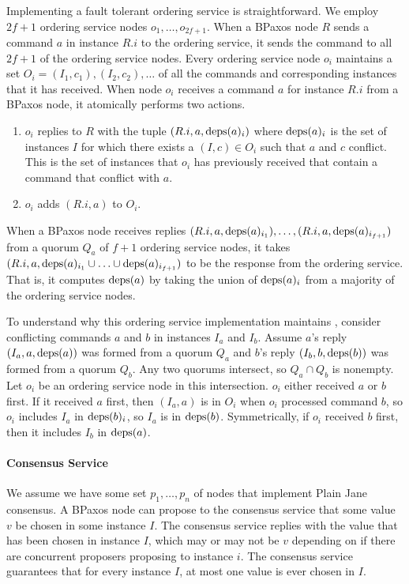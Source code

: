 Implementing a fault tolerant ordering service is straightforward. We employ
$2f + 1$ ordering service nodes $o_{1}, \ldots, o_{2f + 1}$. When a BPaxos node
$R$ sends a command $a$ in instance $R.i$ to the ordering service, it sends the
command to all $2f + 1$ of the ordering service nodes. Every ordering service
node $o_i$ maintains a set $O_i = {(I_1, c_1), (I_2, c_2), \ldots}$ of all the
commands and corresponding instances that it has received. When node $o_i$
receives a command $a$ for instance $R.i$ from a BPaxos node, it atomically
performs two actions.
\begin{enumerate}
  \item
    $o_i$ replies to $R$ with the tuple $(R.i, a, \text{deps}(a)_i)$ where
    $\text{deps}(a)_i$ is the set of instances $I$ for which there exists a $(I, c)
    \in O_i$ such that $a$ and $c$ conflict. This is the set of instances that
    $o_i$ has previously received that contain a command that conflict with
    $a$.

  \item
    $o_i$ adds $(R.i, a)$ to $O_i$.
\end{enumerate}

When a BPaxos node receives replies $(R.i, a, \text{deps}(a)_{i_1}), \ldots, (R.i, a,
\text{deps}(a)_{i_{f+1}})$ from a quorum $Q_a$ of $f + 1$ ordering service nodes, it
takes $(R.i, a, \text{deps}(a)_{i_1} \cup \ldots \cup \text{deps}(a)_{i_{f+1}})$ to be the
response from the ordering service. That is, it computes $\text{deps}(a)$ by taking
the union of $\text{deps}(a)_i$ from a majority of the ordering service nodes.

To understand why this ordering service implementation maintains
, consider conflicting commands $a$ and $b$ in
instances $I_a$ and $I_b$. Assume $a$'s reply $(I_a, a, \text{deps}(a))$ was formed
from a quorum $Q_a$ and $b$'s reply $(I_b, b, \text{deps}(b))$ was formed from a
quorum $Q_b$. Any two quorums intersect, so $Q_a \cap Q_b$ is nonempty. Let
$o_i$ be an ordering service node in this intersection. $o_i$ either received
$a$ or $b$ first. If it received $a$ first, then $(I_a, a)$ is in $O_i$ when
$o_i$ processed command $b$, so $o_i$ includes $I_a$ in $\text{deps}(b)_i$, so $I_a$
is in $\text{deps}(b)$.  Symmetrically, if $o_i$ received $b$ first, then it includes
$I_b$ in $\text{deps}(a)$.

\paragraph{Consensus Service}
We assume we have some set $p_1, \ldots, p_n$ of nodes that implement Plain
Jane consensus. A BPaxos node can propose to the consensus service that some
value $v$ be chosen in some instance $I$. The consensus service replies with
the value that has been chosen in instance $I$, which may or may not be $v$
depending on if there are concurrent proposers proposing to instance $i$. The
consensus service guarantees that for every instance $I$, at most one value is
ever chosen in $I$.

